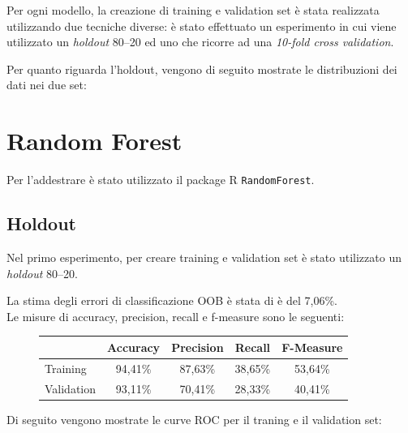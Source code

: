 Per ogni modello, la creazione di training e validation set è stata realizzata 
utilizzando due tecniche diverse: è stato effettuato un esperimento in cui 
viene utilizzato un \textit{holdout} 80--20 ed uno che ricorre ad una 
\textit{10-fold cross validation}.

Per quanto riguarda l'holdout, vengono di seguito mostrate le distribuzioni dei 
dati nei due set:



\section{Random Forest}
Per l'addestrare è stato utilizzato il package R \texttt{RandomForest}.

\subsection{Holdout}
Nel primo esperimento, per creare training e validation set è stato utilizzato 
un \textit{holdout} 80--20.


La stima degli errori di classificazione OOB è stata di è del 7,06\%.\\

Le misure di accuracy, precision, recall e f-measure sono le seguenti:
\begin{figure}[H]
	\centering
	\begin{tabular}{lcccc}
		\toprule
		& \textbf{Accuracy} & \textbf{Precision} & \textbf{Recall} & 
		\textbf{F-Measure}  \\
		\midrule
		Training	& 94,41\% & 87,63\% & 38,65\% & 53,64\%    	\\ 
		Validation	& 93,11\% & 70,41\% & 28,33\% & 40,41\%   	\\ 
		\bottomrule
	\end{tabular}
	\label{tab:rf_performance}
\end{figure}

Di seguito vengono mostrate le curve ROC per il traning e il validation set:

